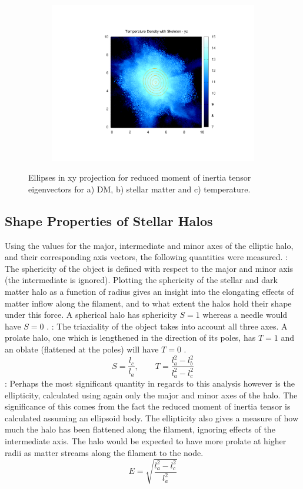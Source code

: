 \documentclass[journal]{IEEEtran}
\begin{document}
\begin{figure}[!t]
\begin{subfigure}[t]{0.3\textwidth}
		\includegraphics[width=\linewidth]{TempDenEllipyz}
	\end{subfigure}
\label{fig:ellipses}
\caption{Ellipses in xy projection for reduced moment of inertia tensor eigenvectors for a) DM, b) stellar matter and c) temperature.}
\end{figure}

\subsection{Shape Properties of Stellar Halos}
Using the values for the major, intermediate and minor axes of the elliptic halo, and their corresponding axis vectors, the following quantities were measured. 
: The sphericity of the object is defined with respect to the major and minor axis (the intermediate is ignored). Plotting the sphericity of the stellar and dark matter halo as a function of radius gives an insight into the elongating effects of matter inflow along the filament, and to what extent the halos hold their shape under this force. A spherical halo has sphericity $S=1$ whereas a needle would have $S=0$ \cite{hahn07a}.
: The triaxiality of the object takes into account all three axes. A prolate halo, one which is lengthened in the direction of its poles, has $T=1$ and an oblate (flattened at the poles) will have $T=0$ \cite{hahn07a}.
\begin{equation}
	S=\frac{l_c}{l_a}, \quad \quad T=\frac{l_a^2-l_b^2}{l_a^2-l_c^2}
	\label{eq:sph&tri}
\end{equation}
: Perhaps the most significant quantity in regards to this analysis however is the ellipticity, calculated using again only the major and minor axes of the halo. The significance of this comes from the fact the reduced moment of inertia tensor is calculated assuming an ellipsoid body. The ellipticity also gives a measure of how much the halo has been flattened along the filament, ignoring effects of the intermediate axis. The halo would be expected to have more prolate at higher radii as matter streams along the filament to the node.
\begin{equation}
	E=\sqrt{\frac{l_a^2-l_c^2}{l_a^2}}
	\label{eq:ellipticity}
\end{equation}
\end{document}
